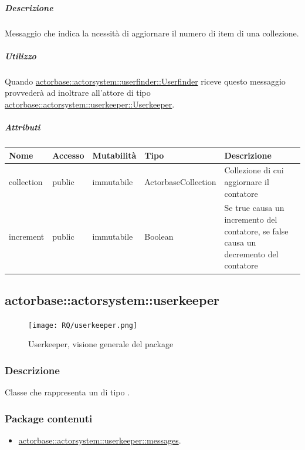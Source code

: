 \documentclass{scalatekids-article}
\begin{document}
\subparagraph{Descrizione}

Messaggio che indica la ncessità di aggiornare il numero di item di una collezione.

\subparagraph{Utilizzo}

Quando \hyperref[sec:actorbase::actorsystem::userfinder::Userfinder]{actorbase::\allowbreak{}actorsystem::\allowbreak{}userfinder::\allowbreak{}Userfinder}
riceve questo messaggio provvederà ad inoltrare all'attore di tipo
\hyperref[sec:actorbase::actorsystem::userkeeper::Userkeeper]{actorbase::\allowbreak{}actorsystem::\allowbreak{}userkeeper::\allowbreak{}Userkeeper}.

\subparagraph{Attributi}
\begin{tabular}{| p{3cm} | p{1.5cm} | p{2cm} | p{2cm} | p{8.5cm} |}
  \hline
  Nome & Accesso & Mutabilità & Tipo & Descrizione\\
  \hline
  collection & public & immutabile & ActorbaseCollection & Collezione di cui aggiornare il contatore \\
  \hline
  increment & public & immutabile & Boolean & Se true causa un incremento del contatore, se false causa un decremento del contatore \\
  \hline
\end{tabular}



\subsection{actorbase::actorsystem::userkeeper}
\label{sec:actorbase::actorsystem::userkeeper}

\begin{figure}[H]
  \begin{center}
    \texttt{[image: RQ/userkeeper.png]}
    \caption{Userkeeper, visione generale del package}
  \end{center}
\end{figure}

\subsubsection{Descrizione}
Classe che rappresenta un  di tipo .

\subsubsection{Package contenuti}
\begin{itemize}
\item \hyperref[sec:actorbase::actorsystem::userkeeper::messages]{actorbase::actorsystem::userkeeper::messages}.
\end{itemize}
\end{document}

